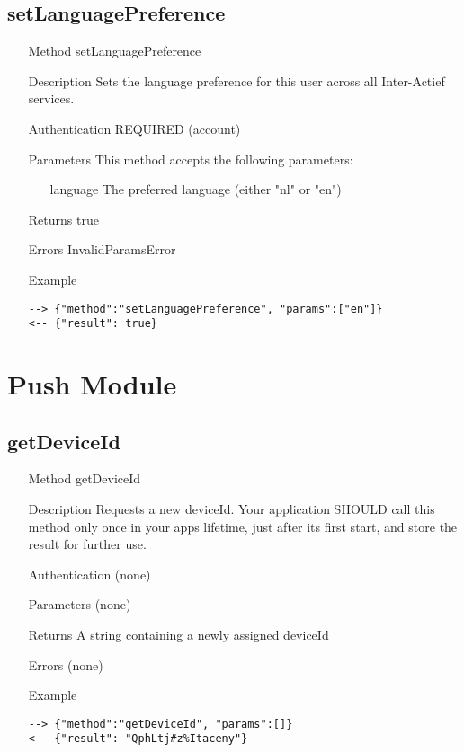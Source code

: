 \documentclass[a4paper]{scrreprt}
\begin{document}
\clearpage
\subsection{setLanguagePreference}
\begin{enumerate}
\item[Method] setLanguagePreference
\item[Description] Sets the language preference for this user across all Inter-Actief services.
\item[Authentication] REQUIRED (account)
\item[Parameters] This method accepts the following parameters:
\begin{enumerate}
    \item[language] The preferred language (either "nl" or "en")
    \end{enumerate}
\item[Returns] true
\item[Errors] InvalidParamsError
\item[Example]
\begin{lstlisting}
--> {"method":"setLanguagePreference", "params":["en"]}
<-- {"result": true}
\end{lstlisting}
\end{enumerate}


\clearpage
\section{Push Module}\label{sec:pushmodule}
\subsection{getDeviceId}\label{m:getDeviceId}
\begin{enumerate}
\item[Method] getDeviceId
\item[Description] Requests a new deviceId. Your application SHOULD call this method only once in your apps lifetime, just after its first start, and store the result for further use.
\item[Authentication] (none)
\item[Parameters] (none)
\item[Returns] A string containing a newly assigned deviceId
\item[Errors] (none)
\item[Example]
\begin{lstlisting}
--> {"method":"getDeviceId", "params":[]}
<-- {"result": "QphLtj#z%Itaceny"}
\end{lstlisting}
\end{enumerate}
\end{document}
